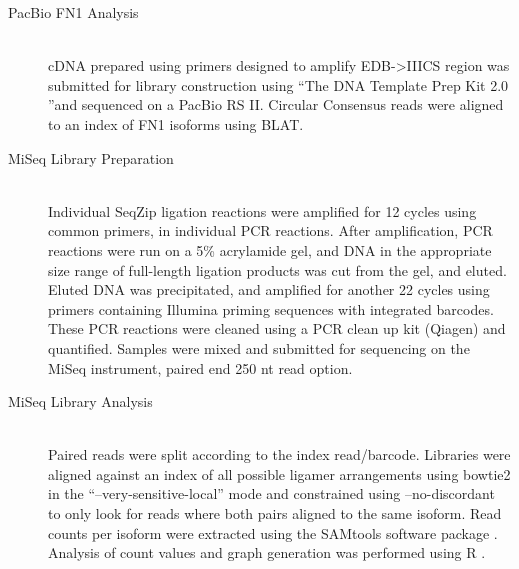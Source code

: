 \begin{description}
		\item[PacBio FN1 Analysis] \hfill \\
		cDNA prepared using primers designed to amplify EDB->IIICS region was submitted for library construction using ``The DNA Template Prep Kit 2.0 ''and sequenced on a PacBio RS II. Circular Consensus reads were aligned to an index of FN1 isoforms using BLAT. 

		\item[MiSeq Library Preparation] \hfill \\
		Individual SeqZip ligation reactions were amplified for 12 cycles using common primers, in individual PCR reactions. After amplification, PCR reactions were run on a 5\% acrylamide gel, and DNA in the appropriate size range of full-length ligation products was cut from the gel, and eluted. Eluted DNA was precipitated, and amplified for another 22 cycles using primers containing Illumina priming sequences with integrated barcodes. These PCR reactions were cleaned using a PCR clean up kit (Qiagen) and quantified. Samples were mixed and submitted for sequencing on the MiSeq instrument, paired end 250 nt read option.

		\item[MiSeq Library Analysis] \hfill \\
		Paired reads were split according to the index read/barcode. Libraries were aligned against an index of all possible \dscam{} ligamer arrangements using bowtie2 \citep{Langmead2012} in the ``–very-sensitive-local'' mode and constrained using –no-discordant to only look for reads where both pairs aligned to the same isoform. Read counts per isoform were extracted using the SAMtools software package \citep{Li2009d}. Analysis of count values and graph generation was performed using R \citep{RDevelopmentCoreTeam2011}.
		

\end{description}
